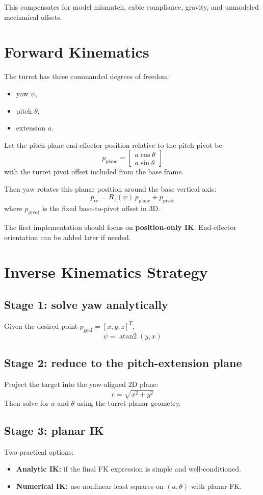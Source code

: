 \documentclass[11pt]{article}
\begin{document}
This compensates for model mismatch, cable compliance, gravity, and unmodeled mechanical offsets.

\section*{Forward Kinematics}
The turret has three commanded degrees of freedom:
\begin{itemize}[leftmargin=1.5em]
  \item yaw \(\psi\),
  \item pitch \(\theta\),
  \item extension \(a\).
\end{itemize}

Let the pitch-plane end-effector position relative to the pitch pivot be
\[
p_{\text{plane}} =
\begin{bmatrix}
a \cos \theta \\
a \sin \theta
\end{bmatrix}
\]
with the turret pivot offset included from the base frame.

Then yaw rotates this planar position around the base vertical axis:
\[
p_{\text{ee}} = R_z(\psi)\, p_{\text{plane}} + p_{\text{pivot}}
\]
where \(p_{\text{pivot}}\) is the fixed base-to-pivot offset in 3D.

The first implementation should focus on \textbf{position-only IK}. End-effector orientation can be added later if needed.

\section*{Inverse Kinematics Strategy}
\subsection*{Stage 1: solve yaw analytically}
Given the desired point \(p_{\text{goal}} = [x, y, z]^T\),
\[
\psi = \operatorname{atan2}(y, x)
\]

\subsection*{Stage 2: reduce to the pitch-extension plane}
Project the target into the yaw-aligned 2D plane:
\[
r = \sqrt{x^2 + y^2}
\]
Then solve for \(a\) and \(\theta\) using the turret planar geometry.

\subsection*{Stage 3: planar IK}
Two practical options:
\begin{itemize}[leftmargin=1.5em]
  \item \textbf{Analytic IK:} if the final FK expression is simple and well-conditioned.
  \item \textbf{Numerical IK:} use nonlinear least squares on \((a, \theta)\) with planar FK.
\end{itemize}
\end{document}
